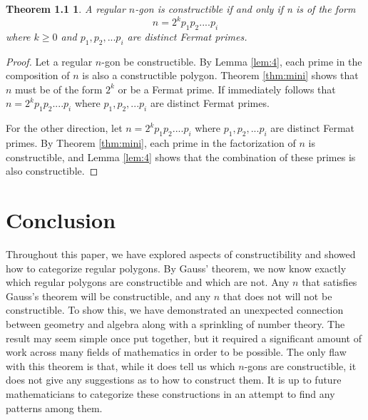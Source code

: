 \documentclass[reqno]{amsart}
\newtheorem*{theoremLESS}{Theorem 1.1}
\theoremstyle{definition}
\numberwithin{equation}{section}
\begin{document}
\begin{theoremLESS}A regular $n$-gon is constructible if and only if n is of the form $$n = 2^kp_1p_2....p_i$$ where $k \ge 0$ and $p_1,p_2,...p_i$ are distinct Fermat primes.\end{theoremLESS}
\begin{proof}
Let a regular $n$-gon be constructible. By Lemma \ref{lem:4}, each prime in the composition of $n$ is also a constructible polygon. Theorem \ref{thm:mini} shows that $n$ must be of the form $2^k$ or be a Fermat prime. If immediately follows that $n = 2^kp_1p_2....p_i$ where $p_1,p_2,...p_i$ are distinct Fermat primes.

For the other direction, let $n = 2^kp_1p_2....p_i$ where $p_1,p_2,...p_i$ are distinct Fermat primes. By Theorem \ref{thm:mini}, each prime in the factorization of $n$ is constructible, and Lemma \ref{lem:4} shows that the combination of these primes is also constructible.
\end{proof}

\section{Conclusion}\label{sec:5}

Throughout this paper, we have explored aspects of constructibility and showed how to categorize regular polygons. By Gauss' theorem, we now know exactly which regular polygons are constructible and which are not. Any $n$ that satisfies Gauss's theorem will be constructible, and any $n$ that does not will not be constructible. To show this, we have demonstrated an unexpected connection between geometry and algebra along with a sprinkling of number theory. The result may seem simple once put together, but it required a significant amount of work across many fields of mathematics in order to be possible. The only flaw with this theorem is that, while it does tell us which $n$-gons are constructible, it does not give any suggestions as to how to construct them. It is up to future mathematicians to categorize these constructions in an attempt to find any patterns among them.




\end{document}

